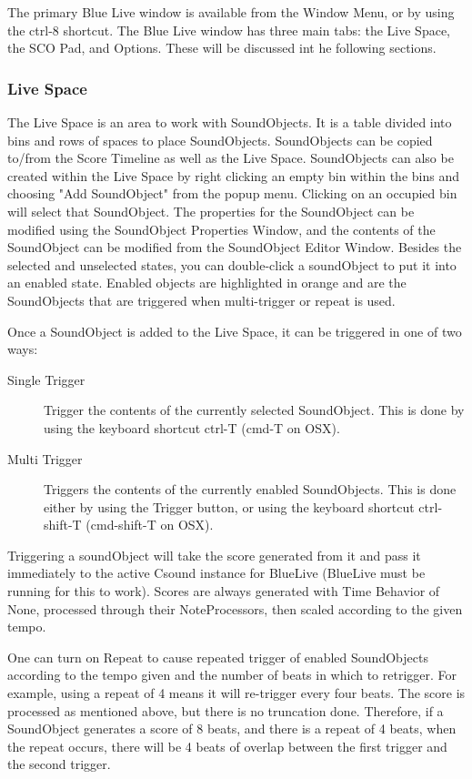 The primary Blue Live window is available from the Window Menu, or by
using the ctrl-8 shortcut. The Blue Live window has three main tabs: the
Live Space, the SCO Pad, and Options. These will be discussed int he
following sections.

\subsubsection{Live Space}

The Live Space is an area to work with SoundObjects. It is a table
divided into bins and rows of spaces to place SoundObjects. SoundObjects
can be copied to/from the Score Timeline as well as the Live Space.
SoundObjects can also be created within the Live Space by right clicking
an empty bin within the bins and choosing "Add SoundObject" from the
popup menu. Clicking on an occupied bin will select that SoundObject.
The properties for the SoundObject can be modified using the SoundObject
Properties Window, and the contents of the SoundObject can be modified
from the SoundObject Editor Window. Besides the selected and unselected
states, you can double-click a soundObject to put it into an enabled
state. Enabled objects are highlighted in orange and are the
SoundObjects that are triggered when multi-trigger or repeat is used.

Once a SoundObject is added to the Live Space, it can be triggered in
one of two ways:

\begin{description}
\item[Single Trigger]
Trigger the contents of the currently selected SoundObject. This is done
by using the keyboard shortcut ctrl-T (cmd-T on OSX).
\item[Multi Trigger]
Triggers the contents of the currently enabled SoundObjects. This is
done either by using the Trigger button, or using the keyboard shortcut
ctrl-shift-T (cmd-shift-T on OSX).
\end{description}

Triggering a soundObject will take the score generated from it and pass
it immediately to the active Csound instance for BlueLive (BlueLive must
be running for this to work). Scores are always generated with Time
Behavior of None, processed through their NoteProcessors, then scaled
according to the given tempo.

One can turn on Repeat to cause repeated trigger of enabled SoundObjects
according to the tempo given and the number of beats in which to
retrigger. For example, using a repeat of 4 means it will re-trigger
every four beats. The score is processed as mentioned above, but there
is no truncation done. Therefore, if a SoundObject generates a score of
8 beats, and there is a repeat of 4 beats, when the repeat occurs, there
will be 4 beats of overlap between the first trigger and the second
trigger.

